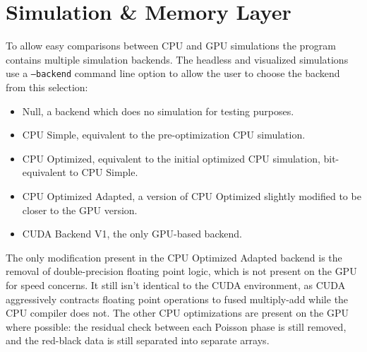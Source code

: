 \section{Simulation \& Memory Layer}

To allow easy comparisons between CPU and GPU simulations the program contains multiple simulation backends.
The headless and visualized simulations use a \texttt{--backend} command line option to allow the user to choose the backend from this selection:\label{sec:DesignBackends}
\begin{itemize}
    \item Null, a backend which does no simulation for testing purposes.
    \item CPU Simple, equivalent to the pre-optimization CPU simulation.
    \item CPU Optimized, equivalent to the initial optimized CPU simulation, bit-equivalent to CPU Simple.
    \item CPU Optimized Adapted, a version of CPU Optimized slightly modified to be closer to the GPU version.
    \item CUDA Backend V1, the only GPU-based backend.
\end{itemize}

The only modification present in the CPU Optimized Adapted backend is the removal of double-precision floating point logic, which is not present on the GPU for speed concerns.
It still isn't identical to the CUDA environment, as CUDA aggressively contracts floating point operations to fused multiply-add while the CPU compiler does not.
The other CPU optimizations are present on the GPU where possible: the residual check between each Poisson phase is still removed, and the red-black data is still separated into separate arrays. 



